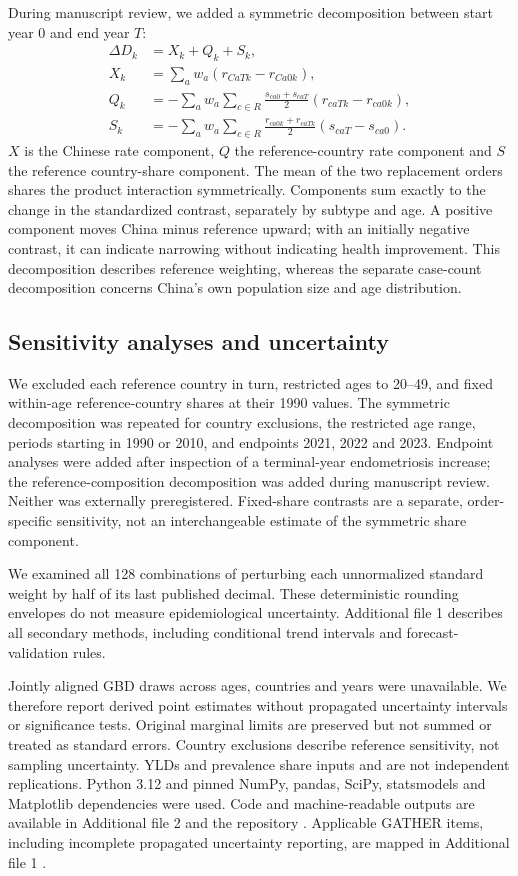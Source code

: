 \documentclass[11pt,a4paper]{article}
\begin{document}
During manuscript review, we added a symmetric decomposition between start year 0 and end year $T$:
\begin{align}
 \Delta D_k &= X_k+Q_k+S_k,\\
 X_k &=\sum_a w_a(r_{CaTk}-r_{Ca0k}),\\
 Q_k &=-\sum_a w_a\sum_{c\in R}\frac{s_{ca0}+s_{caT}}{2}(r_{caTk}-r_{ca0k}),\\
 S_k &=-\sum_a w_a\sum_{c\in R}\frac{r_{ca0k}+r_{caTk}}{2}(s_{caT}-s_{ca0}).
\end{align}
$X$ is the Chinese rate component, $Q$ the reference-country rate component and $S$ the reference country-share component. The mean of the two replacement orders shares the product interaction symmetrically. Components sum exactly to the change in the standardized contrast, separately by subtype and age. A positive component moves China minus reference upward; with an initially negative contrast, it can indicate narrowing without indicating health improvement. This decomposition describes reference weighting, whereas the separate case-count decomposition concerns China's own population size and age distribution.


\subsection{Sensitivity analyses and uncertainty}
We excluded each reference country in turn, restricted ages to 20--49, and fixed within-age reference-country shares at their 1990 values. The symmetric decomposition was repeated for country exclusions, the restricted age range, periods starting in 1990 or 2010, and endpoints 2021, 2022 and 2023. Endpoint analyses were added after inspection of a terminal-year endometriosis increase; the reference-composition decomposition was added during manuscript review. Neither was externally preregistered. Fixed-share contrasts are a separate, order-specific sensitivity, not an interchangeable estimate of the symmetric share component.



We examined all 128 combinations of perturbing each unnormalized standard weight by half of its last published decimal. These deterministic rounding envelopes do not measure epidemiological uncertainty. Additional file 1 describes all secondary methods, including conditional trend intervals and forecast-validation rules.

Jointly aligned GBD draws across ages, countries and years were unavailable. We therefore report derived point estimates without propagated uncertainty intervals or significance tests. Original marginal limits are preserved but not summed or treated as standard errors. Country exclusions describe reference sensitivity, not sampling uncertainty. YLDs and prevalence share inputs and are not independent replications. Python 3.12 and pinned NumPy, pandas, SciPy, statsmodels and Matplotlib dependencies were used. Code and machine-readable outputs are available in Additional file 2 and the repository \cite{repository}. Applicable GATHER items, including incomplete propagated uncertainty reporting, are mapped in Additional file 1 \cite{gather}.
\end{document}
